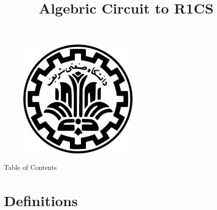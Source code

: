 \documentclass{beamer}
\title{
Algebric Circuit to R1CS
}
\date{}
\newcommand{\npso}{\text{PSO}}
\newcommand{\nmadjoin}{\text{M-Adjoin}}
\begin{document}
\begin{frame}
\begin{figure}[h]
\centering
\includegraphics[scale=0.2]{logo}
\end{figure}

  \titlepage
\end{frame}

\begin{frame}{Table of Contents}

{\footnotesize{}
\begin{multicols}{2}
\tableofcontents
\end{multicols}	
}	
\end{frame}



\section{Definitions}
\end{document}
